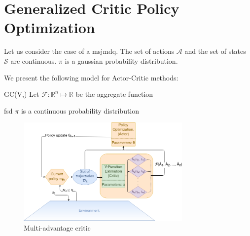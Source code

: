 \section{Generalized Critic Policy Optimization}
\label{sec:method}

Let us consider the case of a msjmdq. The set of actions $\mathcal{A}$ and the set of states $\mathcal{S}$ are continuous. $\pi$ is a gaussian probability distribution.

We present the following model for Actor-Critic methods:

GC(V,)
Let $\mathcal{F}: \mathbb{R}^n \mapsto \mathbb{R}$ be the aggregate function




fsd $\pi$ is a continuous probability distribution
\begin{figure}[!htb]
\includegraphics[width=8.5cm]{images/model}
\caption{Multi-advantage critic}
\label{fig:model}
\end{figure}

%

